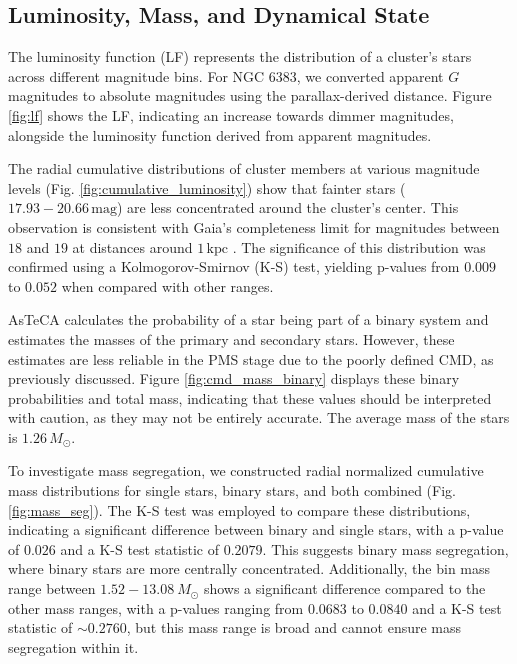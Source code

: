 \documentclass[fleqn,usenatbib,usedcolumn,useAMS]{mnras}
\begin{document}
\subsection{Luminosity, Mass, and Dynamical State}

The luminosity function (LF) represents the distribution of a cluster's stars across different magnitude bins. For NGC 6383, we converted apparent $G$ magnitudes to absolute magnitudes using the parallax-derived distance. Figure \ref{fig:lf} shows the LF, indicating an increase towards dimmer magnitudes, alongside the luminosity function derived from apparent magnitudes.

The radial cumulative distributions of cluster members at various magnitude levels (Fig. \ref{fig:cumulative_luminosity}) show that fainter stars ($17.93 - 20.66\,\mathrm{mag}$) are less concentrated around the cluster's center. This observation is consistent with Gaia's completeness limit for magnitudes between $18$ and $19$ at distances around $1\,\mathrm{kpc}$ \citep{2020MNRAS.497.4246B,2023AA...677A..37C}. The significance of this distribution was confirmed using a Kolmogorov-Smirnov (K-S) test, yielding p-values from $0.009$ to $0.052$ when compared with other ranges.

AsTeCA calculates the probability of a star being part of a binary system and estimates the masses of the primary and secondary stars. However, these estimates are less reliable in the PMS stage due to the poorly defined CMD, as previously discussed. Figure \ref{fig:cmd_mass_binary} displays these binary probabilities and total mass, indicating that these values should be interpreted with caution, as they may not be entirely accurate. The average mass of the stars is $1.26\,M_\odot$. 

To investigate mass segregation, we constructed radial normalized cumulative mass distributions for single stars, binary stars, and both combined (Fig. \ref{fig:mass_seg}). The K-S test was employed to compare these distributions, indicating a significant difference between binary and single stars, with a p-value of $0.026$ and a K-S test statistic of $0.2079$. This suggests binary mass segregation, where binary stars are more centrally concentrated.  Additionally, the bin mass range between $1.52 - 13.08~M_\odot $ shows a significant difference compared to the other mass ranges, with a p-values ranging from $0.0683$ to $0.0840$ and a K-S test statistic of $\sim 0.2760$, but this mass range is broad and cannot ensure mass segregation within it.
\end{document}

